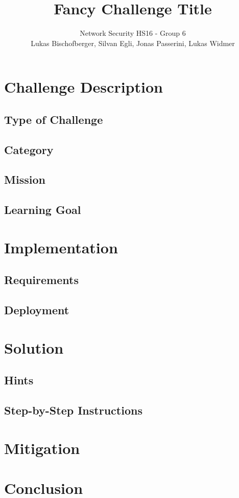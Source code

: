 \documentclass[12pt,a4paper]{article}
\title{Fancy Challenge Title}
\author{Network Security HS16 - Group 6\\Lukas Bischofberger, Silvan Egli, Jonas Passerini, Lukas Widmer}
\begin{document}
\maketitle

\begin{abstract}

\end{abstract}

\section{Challenge Description}

\subsection{Type of Challenge}

\subsection{Category}

\subsection{Mission}

\subsection{Learning Goal}


\section{Implementation}
\subsection{Requirements}
\subsection{Deployment}


\section{Solution}

\subsection{Hints}

\subsection{Step-by-Step Instructions}


\section{Mitigation}

\section{Conclusion}
\end{document}
